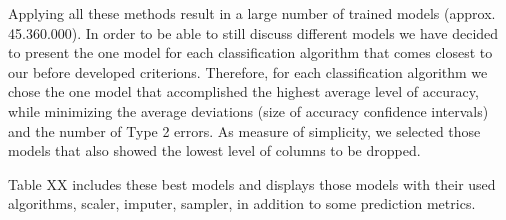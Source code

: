 Applying all these methods result in a large number of trained models (approx. 45.360.000). In order to be able to still discuss different models we have decided to present the one model for each classification algorithm that comes closest to our before developed criterions. Therefore, for each classification algorithm we chose the one model that accomplished the highest average level of accuracy, while minimizing the average deviations (size of accuracy confidence intervals) and the number of Type 2 errors. As measure of simplicity, we selected those models that also showed the lowest level of columns to be dropped. 

Table XX  includes these best models and displays those models with their used algorithms, scaler, imputer, sampler, in addition to some prediction metrics.  


